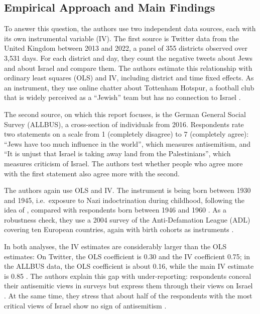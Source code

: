 \subsection{Empirical Approach and Main Findings}

To answer this question, the authors use two independent data sources, each with its own instrumental variable (IV). The first source is Twitter data from the United Kingdom between 2013 and 2022, a panel of 355 districts observed over 3,531 days. For each district and day, they count the negative tweets about Jews and about Israel and compare them.
The authors estimate this relationship with ordinary least squares (OLS) and IV, including district and time fixed effects. As an instrument, they use online chatter about Tottenham Hotspur, a football club that is widely perceived as a ``Jewish'' team but has no connection to Israel \citep[pp.~2333, 2335--2337]{binstok2024}.

The second source, on which this report focuses, is the German General Social Survey (ALLBUS), a cross-section of individuals from 2016.
Respondents rate two statements on a scale from 1 (completely disagree) to 7 (completely agree): ``Jews have too much influence in the world'', which measures antisemitism, and ``It is unjust that Israel is taking away land from the Palestinians'', which measures criticism of Israel. The authors test whether people who agree more with the first statement also agree more with the second.

The authors again use OLS and IV. The instrument is being born between 1930 and 1945, i.e.\ exposure to Nazi indoctrination during childhood, following the idea of \citet{voigtlaender2015}, compared with respondents born between 1946 and 1960 \citep[pp.~2345--2346, 2355--2358]{binstok2024}. As a robustness check, they use a 2004 survey of the Anti-Defamation League (ADL) covering ten European countries, again with birth cohorts as instruments \citep[pp.~2365--2366]{binstok2024}.

In both analyses, the IV estimates are considerably larger than the OLS estimates: 
On Twitter, the OLS coefficient is 0.30 and the IV coefficient 0.75; in the ALLBUS data, the OLS coefficient is about 0.16, while the main IV estimate is 0.85 \citep[pp.~2338, 2340, 2353, 2359]{binstok2024}. The authors explain this gap with under-reporting: respondents conceal their antisemitic views in surveys but express them through their views on Israel \citep[p.~2364]{binstok2024}. At the same time, they stress that about half of the respondents with the most critical views of Israel show no sign of antisemitism \citep[p.~2351]{binstok2024}.

